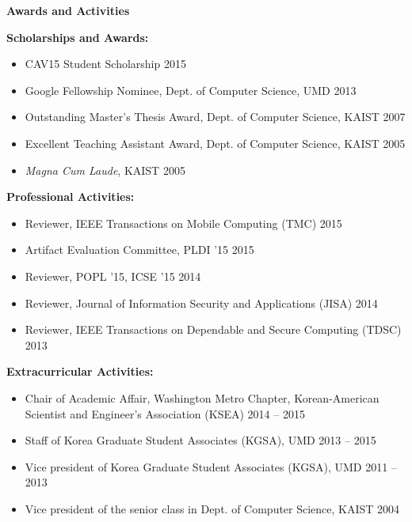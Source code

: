 \documentclass[letterpaper,11pt]{article}
\newcommand{\resheading}[1]{{\large \colorbox{mygrey}{\begin{minipage}{\textwidth}{\textbf{#1 \vphantom{p\^{E}}}}\end{minipage}}}}
\begin{document}

\resheading{Awards and Activities}
  \begin{description}
\item\textbf{Scholarships and Awards:}
\begin{itemize}
\item CAV15 Student Scholarship \hfill 2015
\item Google Fellowship Nominee, Dept. of Computer Science, UMD \hfill 2013 
\item Outstanding Master's Thesis Award, Dept. of Computer Science, KAIST \hfill 2007
\item Excellent Teaching Assistant Award, Dept. of Computer Science, KAIST \hfill 2005
\item \emph{Magna Cum Laude}, KAIST \hfill 2005
\end{itemize}
\item\textbf{Professional Activities:}
\begin{itemize}
\item Reviewer, IEEE Transactions on Mobile Computing (TMC) \hfill 2015
\item Artifact Evaluation Committee, PLDI '15 \hfill 2015
\item Reviewer, POPL '15, ICSE '15 \hfill 2014
\item Reviewer, Journal of Information Security and Applications (JISA) \hfill 2014
\item Reviewer, IEEE Transactions on Dependable and Secure Computing (TDSC) \hfill 2013
\end{itemize}
\item\textbf{Extracurricular Activities:}
\begin{itemize}
\item Chair of Academic Affair, Washington Metro Chapter, Korean-American Scientist and Engineer's Association (KSEA) \hfill 2014 -- 2015
\item Staff of Korea Graduate Student Associates (KGSA), UMD \hfill 2013 -- 2015
\item Vice president of Korea Graduate Student Associates (KGSA), UMD \hfill 2011 -- 2013
\item Vice president of the senior class in Dept. of Computer Science, KAIST \hfill 2004
\end{itemize}
  \end{description} %
\end{document}
